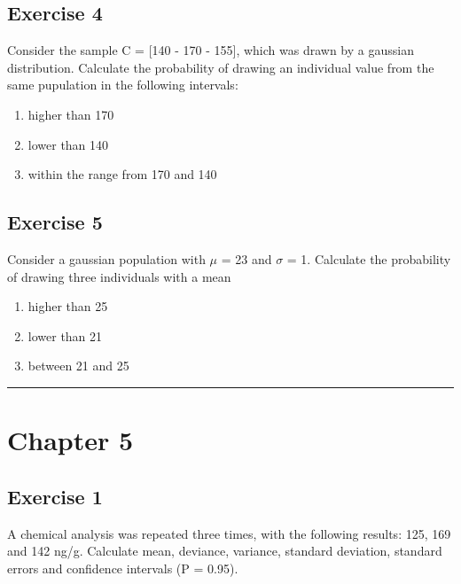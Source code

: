 \documentclass[a4paper,12pt,oneside]{book}
\providecommand{\tightlist}{%
  \setlength{\itemsep}{0pt}\setlength{\parskip}{0pt}}
\begin{document}
\hypertarget{exercise-4}{%
\subsection{Exercise 4}\label{exercise-4}}

Consider the sample C = {[}140 - 170 - 155{]}, which was drawn by a gaussian distribution. Calculate the probability of drawing an individual value from the same pupulation in the following intervals:

\begin{enumerate}
\def\labelenumi{\arabic{enumi}.}
\tightlist
\item
  higher than 170
\item
  lower than 140
\item
  within the range from 170 and 140
\end{enumerate}

\hypertarget{exercise-5}{%
\subsection{Exercise 5}\label{exercise-5}}

Consider a gaussian population with \(\mu\) = 23 and \(\sigma\) = 1. Calculate the probability of drawing three individuals with a mean

\begin{enumerate}
\def\labelenumi{\arabic{enumi}.}
\tightlist
\item
  higher than 25
\item
  lower than 21
\item
  between 21 and 25
\end{enumerate}

\begin{center}\rule{0.5\linewidth}{0.5pt}\end{center}

\hypertarget{chapter-5}{%
\section{Chapter 5}\label{chapter-5}}

\hypertarget{exercise-1-2}{%
\subsection{Exercise 1}\label{exercise-1-2}}

A chemical analysis was repeated three times, with the following results: 125, 169 and 142 ng/g. Calculate mean, deviance, variance, standard deviation, standard errors and confidence intervals (P = 0.95).
\end{document}
